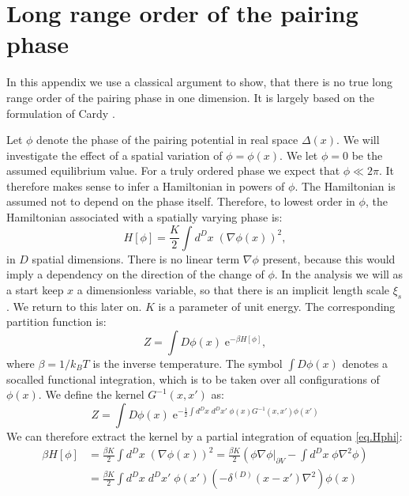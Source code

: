 
\chapter{Long range order of the pairing phase} %

\label{AppendixC} %
\chead{}
In this appendix we use a classical argument to show, that there is no true long range order of the pairing phase in one dimension. It is largely based on the formulation of Cardy \cite{Cardy.StatPhys}. 

Let $\phi$ denote the phase of the pairing potential in real space $\Delta(x)$. We will investigate the effect of a spatial variation of $\phi = \phi(x)$. We let $\phi = 0$ be the assumed equilibrium value. For a truly ordered phase we expect that $\phi \ll 2\pi$. It therefore makes sense to infer a Hamiltonian in powers of $\phi$. The Hamiltonian is assumed not to depend on the phase itself. Therefore, to lowest order in $\phi$, the Hamiltonian associated with a spatially varying phase is: 
\begin{equation}
H[\phi] = \frac{K}{2}\int d^{D}x \; \left(\nabla \phi(x)\right)^2, 
\label{eq.Hphi}
\end{equation}
in $D$ spatial dimensions. There is no linear term $\nabla \phi$ present, because this would imply a dependency on the direction of the change of $\phi$. 
In the analysis we will as a start keep $x$ a dimensionless variable, so that there is an implicit length scale $\xi_s$. We return to this later on. $K$ is a parameter of unit energy. The corresponding partition function is: 
\begin{equation}
Z = \int D\phi(x) \; \text{e}^{-\beta H[\phi]}, 
\label{eq.partitionfunction}
\end{equation}
where $\beta = 1 / k_BT$ is the inverse temperature. The symbol $\int D\phi(x)$ denotes a socalled functional integration, which is to be taken over all configurations of $\phi(x)$. We define the kernel $G^{-1}(x,x')$ as: 
\begin{equation}
Z = \int D\phi(x)\; \text{e}^{-\frac{1}{2}\int d^{D}x\; d^{D}x' \; \phi(x)G^{-1}(x,x')\phi(x')} \nonumber
\end{equation}
We can therefore extract the kernel by a partial integration of equation \eqref{eq.Hphi}: 
\begin{align}
\beta H[\phi] &= \frac{\beta K}{2}\int d^{D}x \; \left(\nabla \phi(x)\right)^2 = \frac{\beta K}{2}\left( \left.\phi\nabla\phi\right|_{\partial V} - \int d^{D}x \; \phi \nabla^2\phi \right) \nonumber \\
&= \frac{\beta K}{2}\int d^{D}x\; d^{D}x'\; \phi(x')\left(-\delta^{(D)}(x - x')\nabla^2\right)\phi(x) \nonumber 
\end{align}
